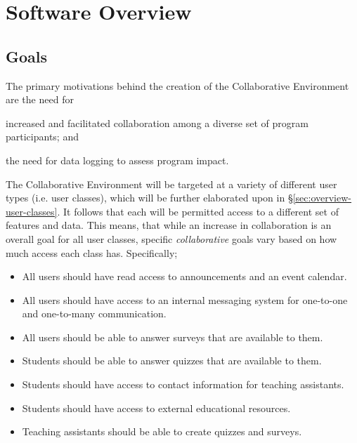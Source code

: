 \chapter{Software Overview}
\label{chap:software-overview}

\section{Goals}
\label{sec:overview-goals}

The primary motivations behind the creation of the Collaborative Environment are the need for
\begin{inparaenum}[\itshape 1\upshape)]
	\item increased and facilitated collaboration among a diverse set of program participants; and
	\item the need for data logging to assess program impact.
\end{inparaenum}
The Collaborative Environment will be targeted at a variety of different user types (i.e. user classes), which will be further elaborated upon in \S \ref{sec:overview-user-classes}. It follows that each will be permitted access to a different set of features and data. This means, that while an increase in collaboration is an overall goal for all user classes, specific \emph{collaborative} goals vary based on how much access each class has. Specifically;

\begin{itemize}
	\item All users should have read access to announcements and an event calendar.
	\item All users should have access to an internal messaging system for one-to-one and one-to-many communication.
	\item All users should be able to answer surveys that are available to them.
	\item Students should be able to answer quizzes that are available to them.
	\item Students should have access to contact information for teaching assistants.
	\item Students should have access to external educational resources.
	\item Teaching assistants should be able to create quizzes and surveys.
\end{itemize}

